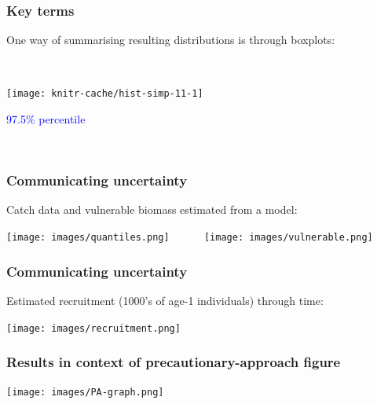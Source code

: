 
\begin{frame}
\frametitle{Key terms}

One way of summarising resulting distributions is through boxplots:

~\\

\begin{knitrout}
\color{fgcolor}
\texttt{[image: knitr-cache/hist-simp-11-1]}

\end{knitrout}
\textcolor{blue}{97.5\% percentile}  %

~\\

\end{frame}


\begin{frame}
\frametitle{Communicating uncertainty}

Catch data and vulnerable biomass estimated from a model:

\centering
\texttt{[image: images/quantiles.png]}
~~~~~
\texttt{[image: images/vulnerable.png]}

\end{frame}


\begin{frame}
\frametitle{Communicating uncertainty}

Estimated recruitment (1000's of age-1 individuals) through time:

\centering
\texttt{[image: images/recruitment.png]}

\end{frame}


\begin{frame}
\frametitle{Results in context of precautionary-approach figure}

\centering
\texttt{[image: images/PA-graph.png]}

\end{frame}


